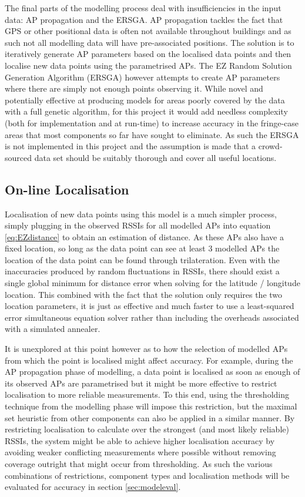 \documentclass{UoYCSproject}
\begin{document}
                The final parts of the modelling process deal with insufficiencies in the input data: AP propagation and the ERSGA. AP propagation tackles the fact that GPS or other positional data is often not available throughout buildings and as such not all modelling data will have pre-associated positions. The solution is to iteratively generate AP parameters based on the localised data points and then localise new data points using the parametrised APs. The EZ Random Solution Generation Algorithm (ERSGA) however attempts to create AP parameters where there are simply not enough points observing it. While novel and potentially effective at producing models for areas poorly covered by the data with a full genetic algorithm, for this project it would add needless complexity (both for implementation and at run-time) to increase accuracy in the fringe-case areas that most components so far have sought to eliminate. As such the ERSGA is not implemented in this project and the assumption is made that a crowd-sourced data set should be suitably thorough and cover all useful locations.
            
            \subsection{On-line Localisation}
            
	            Localisation of new data points using this model is a much simpler process, simply plugging in the observed RSSIs for all modelled APs into equation \ref{eq:EZdistance} to obtain an estimation of distance. As these APs also have a fixed location, so long as the data point can see at least 3 modelled APs the location of the data point can be found through trilateration. Even with the inaccuracies produced by random fluctuations in RSSIs, there should exist a single global minimum for distance error when solving for the latitude / longitude location. This combined with the fact that the solution only requires the two location parameters, it is just as effective and much faster to use a least-squared error simultaneous equation solver rather than including the overheads associated with a simulated annealer.
	            
	            It is unexplored at this point however as to how the selection of modelled APs from which the point is localised might affect accuracy. For example, during the AP propagation phase of modelling, a data point is localised as soon as enough of its observed APs are parametrised but it might be more effective to restrict localisation to more reliable measurements. To this end, using the thresholding technique from the modelling phase will impose this restriction, but the maximal set heuristic from other components can also be applied in a similar manner. By restricting localisation to calculate over the strongest (and most likely reliable) RSSIs, the system might be able to achieve higher localisation accuracy by avoiding weaker conflicting measurements where possible without removing coverage outright that might occur from thresholding. As such the various combinations of restrictions, component types and localisation methods will be evaluated for accuracy in section \ref{sec:modeleval}.
	            
\end{document}
